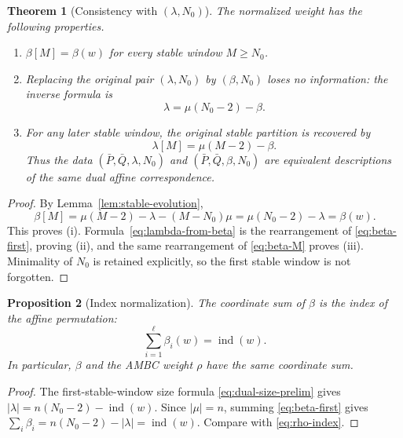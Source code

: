 \documentclass[11pt]{article}
\newtheorem{theorem}{Theorem}[section]
\newtheorem{proposition}[theorem]{Proposition}
\theoremstyle{definition}
\theoremstyle{remark}
\newcommand{\ind}{\operatorname{ind}}
\begin{document}
\begin{theorem}[Consistency with \texorpdfstring{\((\lambda,N_0)\)}{(lambda,N0)}]\label{thm:beta-consistency}
The normalized weight has the following properties.
\begin{enumerate}[label=(\roman*),leftmargin=2.2em]
\item \(\beta[M]=\beta(w)\) for every stable window \(M\ge N_0\).
\item Replacing the original pair \((\lambda,N_0)\) by \((\beta,N_0)\) loses no
information: the inverse formula is
\begin{equation}\label{eq:lambda-from-beta}
                         \lambda=\mu(N_0-2)-\beta.
\end{equation}
\item For any later stable window, the original stable partition is recovered by
\begin{equation}\label{eq:lambdaM-from-beta}
                         \lambda[M]=\mu(M-2)-\beta.
\end{equation}
Thus the data \((\bar P,\bar Q,\lambda,N_0)\) and
\((\bar P,\bar Q,\beta,N_0)\) are equivalent descriptions of the same dual affine
correspondence.
\end{enumerate}
\end{theorem}

\begin{proof}
By Lemma~\ref{lem:stable-evolution},
\[
 \beta[M]
 =\mu(M-2)-\lambda-(M-N_0)\mu
 =\mu(N_0-2)-\lambda
 =\beta(w).
\]
This proves (i).  Formula~\eqref{eq:lambda-from-beta} is the rearrangement of
\eqref{eq:beta-first}, proving (ii), and the same rearrangement of
\eqref{eq:beta-M} proves (iii).  Minimality of \(N_0\) is retained explicitly, so the
first stable window is not forgotten.
\end{proof}

\begin{proposition}[Index normalization]\label{prop:beta-index}
The coordinate sum of \(\beta\) is the index of the affine permutation:
\begin{equation}\label{eq:beta-index}
                         \sum_{i=1}^{\ell}\beta_i(w)=\ind(w).
\end{equation}
In particular, \(\beta\) and the AMBC weight \(\rho\) have the same coordinate sum.
\end{proposition}

\begin{proof}
The first-stable-window size formula \eqref{eq:dual-size-prelim} gives
\(|\lambda|=n(N_0-2)-\ind(w)\).
Since \(|\mu|=n\), summing \eqref{eq:beta-first} gives
\(\sum_i\beta_i=n(N_0-2)-|\lambda|=\ind(w)\).  Compare with
\eqref{eq:rho-index}.
\end{proof}
\end{document}
